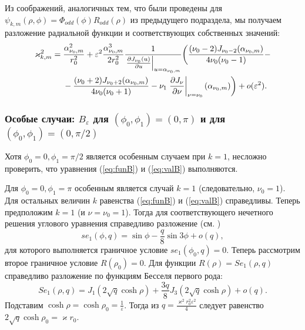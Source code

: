 Из соображений, аналогичных тем, что были проведены для  $\psi_{k, m}(\rho, \phi) = \Phi_{odd}(\phi) R_{odd}(\rho)$ из предыдущего подраздела,
мы получаем разложение радиальной функции и соответствующих собственных значений:
\begin{align*}
    \varkappa_{k, m}^2 ={}& \frac{\alpha_{\nu_0, m}^2}{r_0^2} +  \varepsilon^2 \frac{\alpha_{\nu_0, m}^3}{2 r_0^2}\frac{1}{ \left.\frac{\partial J_{\nu_0}(u)}{\partial u}\right|_{u=\alpha_{\nu_0, m}} }\biggl(\frac{(\nu_0 - 2)J_{\nu_0-2}(\alpha_{\nu_0, m})   }{4\nu_0 (\nu_0-1)} - \notag \\
&{}- \frac{(\nu_0 + 2)J_{\nu_0+2}(\alpha_{\nu_0, m})}{4\nu_0 (\nu_0+1)}  - \nu_1 \left.\frac{\partial J_\nu}{\partial \nu}\right|_{\nu = \nu_0}(\alpha_{\nu_0, m})
    \biggr) + o(\varepsilon^2).
\end{align*}

\subsubsection{Особые случаи: $B_\varepsilon$ для $(\phi_0, \phi_1)=(0,\pi)$ и для $(\phi_0, \phi_1)=(0,\pi/2)$}\label{sec:ch2/sec2/sub2/sub2}


Хотя $\phi_0=0, \phi_1=\pi/2$ является особенным случаем при $k=1$,
несложно проверить, что уравнения (\ref{eq:funB}) и (\ref{eq:valB}) выполняются.

Для  $\phi_0=0, \phi_1=\pi$
особенным является случай  $k=1$ (следовательно, $\nu_0=1$). 
Для остальных величин $k$ равенства (\ref{eq:funB}) и (\ref{eq:valB}) справедливы.
Теперь предположим $k=1$ (и $\nu=\nu_0 = 1$).
Тогда для соответствующего нечетного решения углового уравнения справедливо разложение  (см. \cite[Subsect.~20.2.27]{wref2})
\begin{equation*}
se_1(\phi, q) = 	\sin{\phi}  - 	\frac{q}{8} \sin{3\phi} + o(q),
 \end{equation*}
для которого выполняется граничное условие $se_1(\phi_0, q)=0$. 
Теперь рассмотрим второе граничное условие $R(\rho_0) = 0$. 
Для функции $R(\rho) = Se_1(\rho, q)$ справедливо разложение по функциям Бесселя первого рода:
\begin{equation*}
Se_1(\rho, q) = J_1(2\sqrt{q} \cosh{\rho}) + \frac{3 q}{8} J_3(2\sqrt{q}\cosh{\rho}) + o(q).
\end{equation*}
Подставим $\cosh \rho = \cosh \rho_0 =\frac{1}{\varepsilon}$.
Тогда из $q = \frac{\varkappa^2 r_0^2 \varepsilon^2}{4}$ следует равенство
$2\sqrt{q} \cosh{\rho_0} =  \varkappa r_0$.

